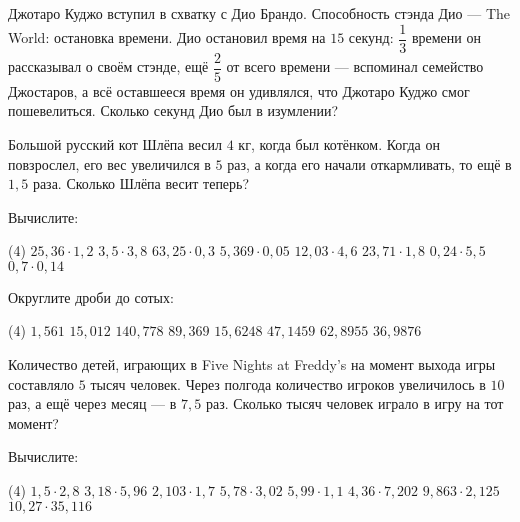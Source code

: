 \begin{class}[number=2]
	\begin{listofex}
		\item Джотаро Куджо вступил в схватку с Дио Брандо. Способность стэнда Дио --- The World: остановка времени. Дио остановил время на \( 15 \) секунд: \( \dfrac{1}{3} \) времени он рассказывал о своём стэнде, ещё \( \dfrac{2}{5} \) от всего времени --- вспоминал семейство Джостаров, а всё оставшееся время он удивлялся, что Джотаро Куджо смог пошевелиться. Сколько секунд Дио был в изумлении?
		\item Большой русский кот Шлёпа весил \( 4 \) кг, когда был котёнком. Когда он повзрослел, его вес увеличился в \( 5 \) раз, а когда его начали откармливать, то ещё в \( 1,5\) раза. Сколько Шлёпа весит теперь?
		\item Вычислите:
		\begin{tasks}(4)
			\task \( 25,36\cdot1,2 \)
			\task \( 3,5\cdot3,8 \)
			\task \( 63,25\cdot0,3 \)
			\task \( 5,369\cdot0,05 \)
			\task \( 12,03\cdot4,6 \)
			\task \( 23,71\cdot1,8 \)
			\task \( 0,24\cdot5,5 \)
			\task \( 0,7\cdot0,14 \)
		\end{tasks}
		\item Округлите дроби до сотых:
		\begin{tasks}(4)
			\task \( 1,561 \)
			\task \( 15,012 \)
			\task \( 140,778 \)
			\task \( 89,369 \)
			\task \( 15,6248 \)
			\task \( 47,1459 \)
			\task \( 62,8955 \)
			\task \( 36,9876 \)
		\end{tasks}
	\end{listofex}
\end{class}

\begin{homework}[number=2]
	\begin{listofex}
		\item Количество детей, играющих в Five Nights at Freddy's на момент выхода игры составляло \( 5 \) тысяч человек. Через полгода количество игроков увеличилось в \( 10 \) раз, а ещё через месяц --- в \( 7,5 \) раз. Сколько тысяч человек играло в игру на тот момент?
		\item Вычислите:
		\begin{tasks}(4)
			\task \( 1,5\cdot2,8 \)
			\task \( 3,18\cdot5,96 \)
			\task \( 2,103\cdot1,7 \)
			\task \( 5,78\cdot3,02 \)
			\task \( 5,99\cdot1,1 \)
			\task \( 4,36\cdot7,202 \)
			\task \( 9,863\cdot2,125 \)
			\task \( 10,27\cdot35,116 \)
		\end{tasks}
	\end{listofex}
\end{homework}


